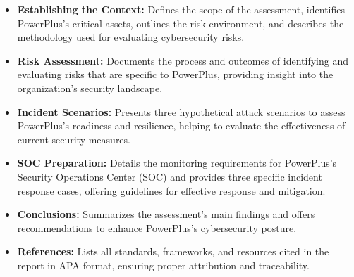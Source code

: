 \begin{itemize}
    \item \textbf{Establishing the Context:} Defines the scope of the assessment, identifies PowerPlus's critical assets, outlines the risk environment, and describes the methodology used for evaluating cybersecurity risks.
    \item \textbf{Risk Assessment:} Documents the process and outcomes of identifying and evaluating risks that are specific to PowerPlus, providing insight into the organization’s security landscape.
    \item \textbf{Incident Scenarios:} Presents three hypothetical attack scenarios to assess PowerPlus’s readiness and resilience, helping to evaluate the effectiveness of current security measures.
    \item \textbf{SOC Preparation:} Details the monitoring requirements for PowerPlus’s Security Operations Center (SOC) and provides three specific incident response cases, offering guidelines for effective response and mitigation.
    \item \textbf{Conclusions:} Summarizes the assessment’s main findings and offers recommendations to enhance PowerPlus’s cybersecurity posture.
    \item \textbf{References:} Lists all standards, frameworks, and resources cited in the report in APA format, ensuring proper attribution and traceability.
\end{itemize}
\let\cleardoublepage\clearpage